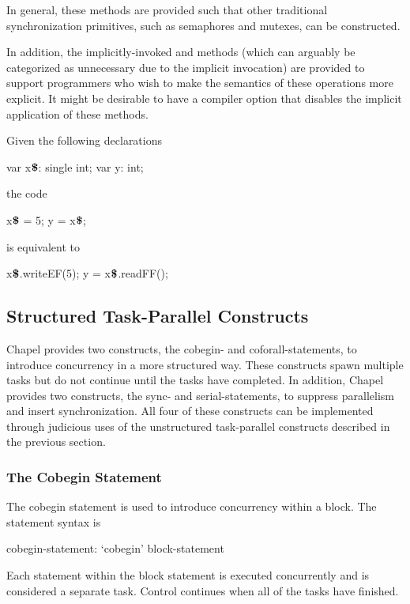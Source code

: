\begin{rationale}
In general, these methods are provided such that other traditional
synchronization primitives, such as semaphores and mutexes, can be
constructed.

In addition, the implicitly-invoked  and 
methods (which can arguably be categorized as unnecessary due to the
implicit invocation) are provided to support programmers who wish to
make the semantics of these operations more explicit.  It might be
desirable to have a compiler option that disables the implicit
application of these methods.
\end{rationale}

\begin{example}
Given the following declarations
\begin{chapel}
var x$\mbox{{\bf \$}}$: single int;
var y: int;
\end{chapel}
the code
\begin{chapel}
x$\mbox{{\bf \$}}$ = 5;
y = x$\mbox{{\bf \$}}$;
\end{chapel}
is equivalent to
\begin{chapel}
x$\mbox{{\bf \$}}$.writeEF(5);
y = x$\mbox{{\bf \$}}$.readFF();
\end{chapel}
\end{example}

\subsection{Structured Task-Parallel Constructs}
\label{structured_task_parallelism}

Chapel provides two constructs, the cobegin- and coforall-statements,
to introduce concurrency in a more structured way.  These constructs
spawn multiple tasks but do not continue until the tasks have
completed.  In addition, Chapel provides two constructs, the sync- and
serial-statements, to suppress parallelism and insert synchronization.
All four of these constructs can be implemented through judicious uses
of the unstructured task-parallel constructs described in the previous
section.

\subsubsection{The Cobegin Statement}
\label{Cobegin}

The cobegin statement is used to introduce concurrency within a
block.  The  statement syntax is
\begin{syntax}
cobegin-statement:
  `cobegin' block-statement
\end{syntax}
Each statement within the block statement is executed concurrently and
is considered a separate task.  Control continues when all of the
tasks have finished.

